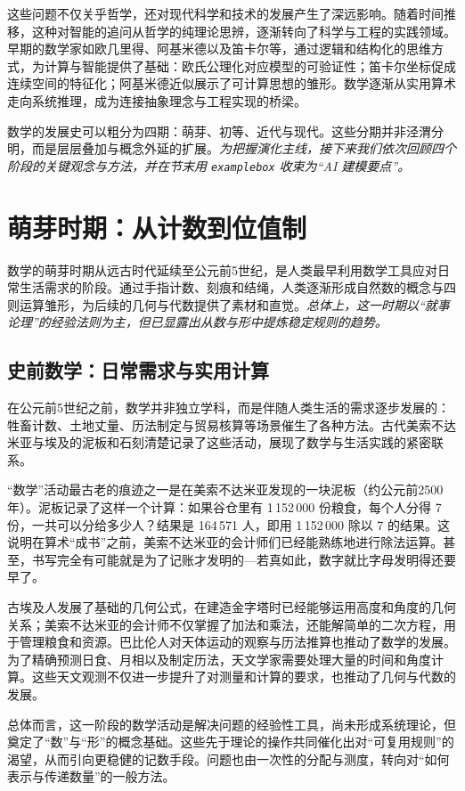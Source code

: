 这些问题不仅关乎哲学，还对现代科学和技术的发展产生了深远影响。随着时间推移，这种对智能的追问从哲学的纯理论思辨，逐渐转向了科学与工程的实践领域。早期的数学家如欧几里得、阿基米德以及笛卡尔等，通过逻辑和结构化的思维方式，为计算与智能提供了基础：欧氏公理化对应模型的可验证性；笛卡尔坐标促成连续空间的特征化；阿基米德近似展示了可计算思想的雏形。数学逐渐从实用算术走向系统推理，成为连接抽象理念与工程实现的桥梁。

数学的发展史可以粗分为四期：萌芽、初等、近代与现代。这些分期并非泾渭分明，而是层层叠加与概念外延的扩展。\emph{为把握演化主线，接下来我们依次回顾四个阶段的关键观念与方法，并在节末用 \texttt{examplebox} 收束为“AI 建模要点”。}

\section{萌芽时期：从计数到位值制}

数学的萌芽时期从远古时代延续至公元前5世纪，是人类最早利用数学工具应对日常生活需求的阶段。通过手指计数、刻痕和结绳，人类逐渐形成自然数的概念与四则运算雏形，为后续的几何与代数提供了素材和直觉。\emph{总体上，这一时期以“就事论理”的经验法则为主，但已显露出从数与形中提炼稳定规则的趋势。}

\subsection{史前数学：日常需求与实用计算}

在公元前5世纪之前，数学并非独立学科，而是伴随人类生活的需求逐步发展的：牲畜计数、土地丈量、历法制定与贸易核算等场景催生了各种方法。古代美索不达米亚与埃及的泥板和石刻清楚记录了这些活动，展现了数学与生活实践的紧密联系。

“数学”活动最古老的痕迹之一是在美索不达米亚发现的一块泥板（约公元前2500年）。泥板记录了这样一个计算：如果谷仓里有 1\,152\,000 份粮食，每个人分得 7 份，一共可以分给多少人？结果是 164\,571 人，即用 1\,152\,000 除以 7 的结果。这说明在算术“成书”之前，美索不达米亚的会计师们已经能熟练地进行除法运算。甚至，书写完全有可能就是为了记账才发明的---若真如此，数字就比字母发明得还要早了。

古埃及人发展了基础的几何公式，在建造金字塔时已经能够运用高度和角度的几何关系；美索不达米亚的会计师不仅掌握了加法和乘法，还能解简单的二次方程，用于管理粮食和资源。巴比伦人对天体运动的观察与历法推算也推动了数学的发展。为了精确预测日食、月相以及制定历法，天文学家需要处理大量的时间和角度计算。这些天文观测不仅进一步提升了对测量和计算的要求，也推动了几何与代数的发展。

总体而言，这一阶段的数学活动是解决问题的经验性工具，尚未形成系统理论，但奠定了“数”与“形”的概念基础。这些先于理论的操作共同催化出对“可复用规则”的渴望，从而引向更稳健的记数手段。问题也由一次性的分配与测度，转向对“如何表示与传递数量”的一般方法。

